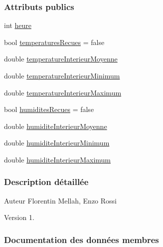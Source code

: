 \subsubsection*{Attributs publics}
\begin{DoxyCompactItemize}
\item 
int \hyperlink{struct_mesure_horaire_ruche_ab679cc7168deb6c3d2458c99b94e0611}{heure}
\item 
bool \hyperlink{struct_mesure_horaire_ruche_ade9984cb0f2c62b3ba1369f77249bb4a}{temperatures\+Recues} = false
\item 
double \hyperlink{struct_mesure_horaire_ruche_ac240bf701116e1a09f2bf33911bf57ef}{temperature\+Interieur\+Moyenne}
\item 
double \hyperlink{struct_mesure_horaire_ruche_a51c45378a78c733704df79b38d61afcc}{temperature\+Interieur\+Minimum}
\item 
double \hyperlink{struct_mesure_horaire_ruche_a746c391a70735bfff63bf7271ab28ab8}{temperature\+Interieur\+Maximum}
\item 
bool \hyperlink{struct_mesure_horaire_ruche_a4f825f05bf4e61db7b18a08dee759b7a}{humidites\+Recues} = false
\item 
double \hyperlink{struct_mesure_horaire_ruche_a46f517d342e230b4e3d0b84a96b79aac}{humidite\+Interieur\+Moyenne}
\item 
double \hyperlink{struct_mesure_horaire_ruche_adf0cbf1a3451cced1ba6fb9573654236}{humidite\+Interieur\+Minimum}
\item 
double \hyperlink{struct_mesure_horaire_ruche_ac8733bd08c235de27dd3eea85749c3f6}{humidite\+Interieur\+Maximum}
\end{DoxyCompactItemize}


\subsubsection{Description détaillée}
\begin{DoxyAuthor}{Auteur}
Florentin Mellah, Enzo Rossi
\end{DoxyAuthor}
\begin{DoxyVersion}{Version}
1. 
\end{DoxyVersion}


\subsubsection{Documentation des données membres}
\mbox{\label{struct_mesure_horaire_ruche_ab679cc7168deb6c3d2458c99b94e0611}} 
